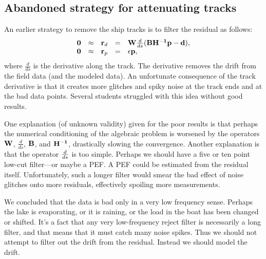 \subsection{Abandoned strategy for attenuating tracks}
An earlier strategy to remove the ship tracks is to filter the
residual as follows:
\begin{equation}
  \begin{array}{lllll}
    \bold 0 &\approx& \bold r_d &=& \bold W \frac{d}{ds}( \bold B \bold {H^{-1}} \bold p - \bold d
    ),\\
    \bold 0 &\approx& \bold r_p &=& \epsilon \bold p,
  \end{array} \label{eq5}
\end{equation}
where $\frac{d}{ds}$ is the derivative along the track. The derivative 
removes the drift from the field data (and the modeled data).
An unfortunate consequence of the track derivative
is that it creates more glitches and spiky noise at the track ends and
at the bad data points.
Several students struggled with this idea without good results.

\par
One explanation (of unknown validity)
given for the poor results is that perhaps
the numerical conditioning
of the algebraic problem is worsened by the operators $\bold W$, 
$\frac{d}{ds}$, $\bold B$, and $\bold {H^{-1}}$,
drastically slowing the convergence.
Another explanation is that the operator $d\over ds$ is too simple.
Perhaps we should have a five or ten point low-cut filter---or maybe a PEF.
A PEF could be estimated from the residual itself.
Unfortunately, such a longer filter would smear the bad effect
of noise glitches onto more residuals,
effectively spoiling more measurements.

\par
We concluded that the data is bad only in a very low frequency sense.
Perhaps the lake is evaporating, or it is raining,
or the load in the boat has been changed or shifted.
It's a fact that any very low-frequency reject filter
is necessarily a long filter,
and that means that it must catch many noise spikes.
Thus we should not attempt to filter out the drift from the residual.
Instead we should model the drift.

\par
{}

